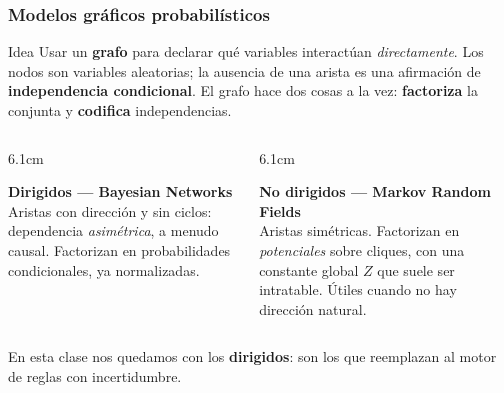 \documentclass[aspectratio=169, 10pt]{beamer}
\begin{document}
\begin{frame}
\frametitle{Modelos gráficos probabilísticos}
\begin{block}{Idea}
\footnotesize
Usar un \textbf{grafo} para declarar qué variables interactúan \emph{directamente}. Los nodos son variables aleatorias; la ausencia de una arista es una afirmación de \textbf{independencia condicional}. El grafo hace dos cosas a la vez: \textbf{factoriza} la conjunta y \textbf{codifica} independencias.
\end{block}
\vspace{0.2em}
\begin{columns}[T]
\begin{column}{6.1cm}
\begin{center}
\end{center}
\footnotesize
\textbf{Dirigidos --- Bayesian Networks}\\
Aristas con dirección y sin ciclos: dependencia \emph{asimétrica}, a menudo causal. Factorizan en probabilidades condicionales, ya normalizadas.
\end{column}
\begin{column}{6.1cm}
\begin{center}
\end{center}
\footnotesize
\textbf{No dirigidos --- Markov Random Fields}\\
Aristas simétricas. Factorizan en \emph{potenciales} sobre cliques, con una constante global $Z$ que suele ser intratable. Útiles cuando no hay dirección natural.
\end{column}
\end{columns}
\vspace{0.1em}
\footnotesize En esta clase nos quedamos con los \textbf{dirigidos}: son los que reemplazan al motor de reglas con incertidumbre.
\end{frame}
\end{document}
